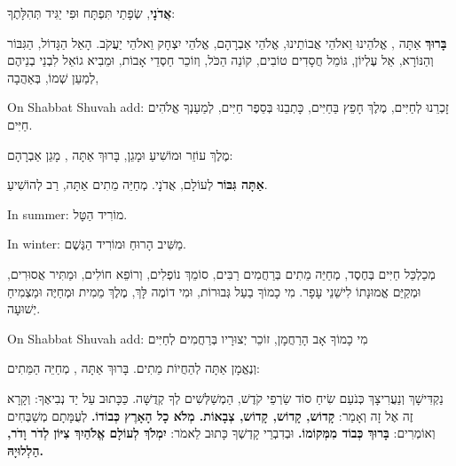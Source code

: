 
\label{mincha-amidah}

\textbf{אֲדֹנָי}, שְׂפָתַי תִּפְתָּח וּפִי יַגִּיד תְּהִלָּתֶךָ:

\textbf{בָּרוּךְ} אַתָּה \Shem{}, אֱלֹהֵינוּ וֵאלֹהֵי אֲבוֹתֵינוּ, אֱלֹהֵי אַבְרָהָם, אֱלֹהֵי יִצְחָק וֵאלֹהֵי יַעֲקֹב. הָאֵל הַגָּדוֹל, הַגִּבּוֹר וְהַנּוֹרָא, אֵל עֶלְיוֹן, גּוֹמֵל חֲסָדִים טוֹבִים, קוֹנֵה הַכֹּל, וְזוֹכֵר חַסְדֵי אָבוֹת, וּמֵבִיא גוֹאֵל לִבְנֵי בְנֵיהֶם לְמַעַן שְׁמוֹ, בְּאַהֲבָה,

\begin{seasonal}{On Shabbat Shuvah add:}
זָכְרֵנוּ לְחַיִּים, מֶלֶךְ חָפֵץ בַּחַיִּים, כָּתְבֵנוּ בְּסֵפֶר חַיִּים, לְמַעַנְךָ אֱלֹהִים חַיִּים.
\end{seasonal}

מֶלֶךְ עוֹזֵר וּמוֹשִׁיעַ וּמָגֵן, בָּרוּךְ אַתָּה \Shem{}, מָגֵן אַבְרָהָם:

\textbf{אַתָּה גִּבּוֹר} לְעוֹלָם, אֲדֹנָי. מְחַיֵּה מֵתִים אַתָּה, רַב לְהוֹשִׁיעַ.

\begin{seasonal}{In summer:}
מוֹרִיד הַטָּל.
\end{seasonal}

\begin{seasonal}{In winter:}
מַשִּׁיב הָרוּחַ וּמוֹרִיד הַגֶּשֶׁם.
\end{seasonal}

מְכַלְכֵּל חַיִּים בְּחֶסֶד, מְחַיֵּה מֵתִים בְּרַחֲמִים רַבִּים, סוֹמֵךְ נוֹפְלִים, וְרוֹפֵא חוֹלִים, וּמַתִּיר אֲסוּרִים, וּמְקַיֵּם אֱמוּנָתוֹ לִישֵׁנֵי עָפָר. מִי כָמוֹךָ בַעַל גְּבוּרוֹת, וּמִי דוֹמֶה לָּךְ, מֶלֶךְ מֵמִית וּמְחַיֶּה וּמַצְמִיחַ יְשׁוּעָה.

\begin{seasonal}{On Shabbat Shuvah add:}
מִי כָמוֹךָ אָב הָרַחֲמָן, זוֹכֵר יְצוּרָיו בְּרַחֲמִים לְחַיִּים
\end{seasonal}

וְנֶאֱמָן אַתָּה לְהַחֲיוֹת מֵתִים. בָּרוּךְ אַתָּה \Shem{}, מְחַיֵּה הַמֵּתִים:

נַקְדִּישָׁךְ וְנַעֲרִיצָךְ כְּנֹעַם שִׂיחַ סוֹד שַׂרְפֵי קֹדֶשׁ, הַמְשַׁלְּשִׁים לְךָ קְדֻשָּׁה. כַּכָּתוּב עַל יַד נְבִיאֶךָ: וְקָרָא זֶה אֶל זָה וְאָמַר: \textbf{קָדוֹש, קָדוֹש, קָדוֹש, \Shem{} צְבָאוֹת. מְלֹא כָל הָאָרֶץ כְּבוֹדוֹ.} לְעֻמָּתָם מְשַׁבְּחִים וְאוֹמְרִים: \textbf{בָּרוּךְ כְּבוֹד \Shem{} מִמְּקוֹמוֹ.} וּבְדִבְרֵי קָדְשְׁךָ כָּתוּב לֵאמֹר: \textbf{יִמְלֹךְ \Shem{} לְעוֹלָם אֱלֹהַיִךְ צִיּוֹן לְדֹר וָדֹר, הַלְלוּיָהּ.}

